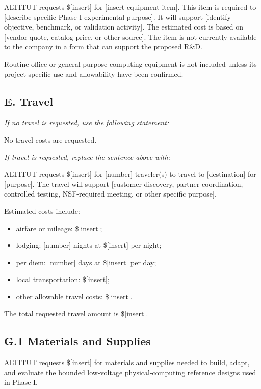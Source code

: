 \documentclass[11pt,letterpaper]{article}
\begin{document}
ALTITUT requests \$[insert] for [insert equipment item]. This item is required
to [describe specific Phase I experimental purpose]. It will support
[identify objective, benchmark, or validation activity]. The estimated cost is
based on [vendor quote, catalog price, or other source]. The item is not
currently available to the company in a form that can support the proposed
R\&D.

Routine office or general-purpose computing equipment is not included unless
its project-specific use and allowability have been confirmed.

\subsection*{E. Travel}

\textit{If no travel is requested, use the following statement:}

No travel costs are requested.

\medskip

\textit{If travel is requested, replace the sentence above with:}

ALTITUT requests \$[insert] for [number] traveler(s) to travel to
[destination] for [purpose]. The travel will support [customer discovery,
partner coordination, controlled testing, NSF-required meeting, or other
specific purpose].

Estimated costs include:

\begin{itemize}
    \item airfare or mileage: \$[insert];
    \item lodging: [number] nights at \$[insert] per night;
    \item per diem: [number] days at \$[insert] per day;
    \item local transportation: \$[insert];
    \item other allowable travel costs: \$[insert].
\end{itemize}

The total requested travel amount is \$[insert].

\subsection*{G.1 Materials and Supplies}

ALTITUT requests \$[insert] for materials and supplies needed to build,
adapt, and evaluate the bounded low-voltage physical-computing reference
designs used in Phase I.
\end{document}
